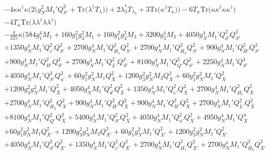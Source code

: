 {\begin{align}
 &-4 {\kappa  \kappa^{\dagger}  \kappa} \Big(2 \Big(g_{N}^{2} M_1' Q_{S'}^{2}  + \mbox{Tr}\Big({\lambda^{\dagger}  T_{\lambda}}\Big)\Big) + 2 \lambda_3^* T_{\lambda_3}  + 3 \mbox{Tr}\Big({\kappa^{\dagger}  T_{\kappa}}\Big) \Big)-6 T_{\kappa} \mbox{Tr}\Big({\kappa  \kappa^{\dagger}  \kappa  \kappa^{\dagger}}\Big) \nonumber \\ 
 &-4 T_{\kappa} \mbox{Tr}\Big({\lambda  \lambda^{\dagger}  \lambda  \lambda^{\dagger}}\Big) \nonumber \\ 
 &-\frac{4}{225} \kappa \Big(584 g_{1}^{4} M_1 +160 g_{1}^{2} g_{3}^{2} M_1 +160 g_{1}^{2} g_{3}^{2} M_3 +3200 g_{3}^{4} M_3 +4050 g_{N}^{4} M_1' Q_{d'}^{2} Q_{S'}^{2} \nonumber \\ 
 &+1350 g_{N}^{4} M_1' Q_{e'}^{2} Q_{S'}^{2} +2700 g_{N}^{4} M_1' Q_{H_1}^{2} Q_{S'}^{2} +2700 g_{N}^{4} M_1' Q_{H_2}^{2} Q_{S'}^{2} +900 g_{N}^{4} M_1' Q_{\bar{H}'}^{2} Q_{S'}^{2} \nonumber \\ 
 &+900 g_{N}^{4} M_1' Q_{H'}^{2} Q_{S'}^{2} +2700 g_{N}^{4} M_1' Q_{L'}^{2} Q_{S'}^{2} +8100 g_{N}^{4} M_1' Q_{Q'}^{2} Q_{S'}^{2} +2250 g_{N}^{4} M_1' Q_{S'}^{4} \nonumber \\ 
 &+4050 g_{N}^{4} M_1' Q_{S'}^{2} Q_{u'}^{2} +60 g_{1}^{2} g_{N}^{2} M_1 Q_{\bar{X}}^{2} +1200 g_{3}^{2} g_{N}^{2} M_3 Q_{\bar{X}}^{2} +60 g_{1}^{2} g_{N}^{2} M_1' Q_{\bar{X}}^{2} \nonumber \\ 
 &+1200 g_{3}^{2} g_{N}^{2} M_1' Q_{\bar{X}}^{2} +4050 g_{N}^{4} M_1' Q_{d'}^{2} Q_{\bar{X}}^{2} +1350 g_{N}^{4} M_1' Q_{e'}^{2} Q_{\bar{X}}^{2} +2700 g_{N}^{4} M_1' Q_{H_1}^{2} Q_{\bar{X}}^{2} \nonumber \\ 
 &+2700 g_{N}^{4} M_1' Q_{H_2}^{2} Q_{\bar{X}}^{2} +900 g_{N}^{4} M_1' Q_{\bar{H}'}^{2} Q_{\bar{X}}^{2} +900 g_{N}^{4} M_1' Q_{H'}^{2} Q_{\bar{X}}^{2} +2700 g_{N}^{4} M_1' Q_{L'}^{2} Q_{\bar{X}}^{2} \nonumber \\ 
 &+8100 g_{N}^{4} M_1' Q_{Q'}^{2} Q_{\bar{X}}^{2} +5400 g_{N}^{4} M_1' Q_{S'}^{2} Q_{\bar{X}}^{2} +4050 g_{N}^{4} M_1' Q_{u'}^{2} Q_{\bar{X}}^{2} +4950 g_{N}^{4} M_1' Q_{\bar{X}}^{4} \nonumber \\ 
 &+60 g_{1}^{2} g_{N}^{2} M_1 Q_{X'}^{2} +1200 g_{3}^{2} g_{N}^{2} M_3 Q_{X'}^{2} +60 g_{1}^{2} g_{N}^{2} M_1' Q_{X'}^{2} +1200 g_{3}^{2} g_{N}^{2} M_1' Q_{X'}^{2} \nonumber \\ 
 &+4050 g_{N}^{4} M_1' Q_{d'}^{2} Q_{X'}^{2} +1350 g_{N}^{4} M_1' Q_{e'}^{2} Q_{X'}^{2} +2700 g_{N}^{4} M_1' Q_{H_1}^{2} Q_{X'}^{2} +2700 g_{N}^{4} M_1' Q_{H_2}^{2} Q_{X'}^{2} \nonumber \\ 

\end{align}}
